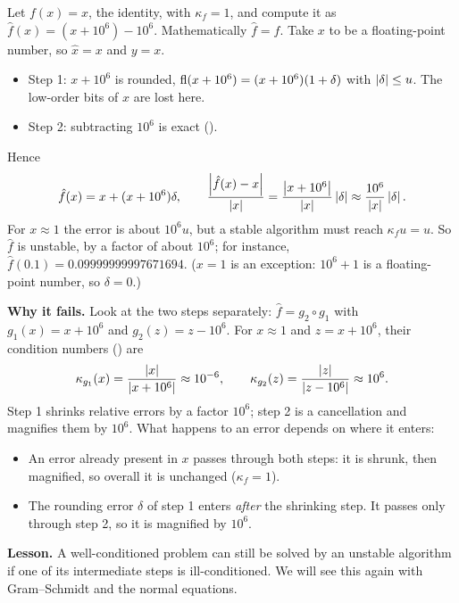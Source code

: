 \begin{example}
  \label{ex:unstable-identity}
  Let $f(x) = x$, the identity, with $\kappa_f = 1$, and compute it as $\hat{f}(x) = (x + 10^6) - 10^6$. Mathematically $\hat{f} = f$. Take $x$ to be a floating-point number, so $\hat{x} = x$ and $y = x$.
  \begin{itemize}
    \item Step 1: $x + 10^6$ is rounded, $\operatorname{fl}(x + 10^6) = (x + 10^6)(1 + \delta)$ with $\left\lvert \delta \right\rvert \le u$. The low-order bits of $x$ are lost here.
    \item Step 2: subtracting $10^6$ is exact ().
  \end{itemize}
  Hence
  \begin{equation}
    \hat{f}(x) = x + (x + 10^6)\delta,
    \qquad
    \frac{\left\lvert \hat{f}(x) - x \right\rvert}{\left\lvert x \right\rvert} = \frac{\left\lvert x + 10^6 \right\rvert}{\left\lvert x \right\rvert}\left\lvert \delta \right\rvert \approx \frac{10^6}{\left\lvert x \right\rvert}\left\lvert \delta \right\rvert.
  \end{equation}
  For $x \approx 1$ the error is about $10^6 u$, but a stable algorithm must reach $\kappa_f u = u$. So $\hat{f}$ is unstable, by a factor of about $10^6$; for instance, $\hat{f}(0.1) = 0.09999999997671694$. ($x = 1$ is an exception: $10^6 + 1$ is a floating-point number, so $\delta = 0$.)

  \textbf{Why it fails.} Look at the two steps separately: $\hat{f} = g_2 \circ g_1$ with $g_1(x) = x + 10^6$ and $g_2(z) = z - 10^6$. For $x \approx 1$ and $z = x + 10^6$, their condition numbers () are
  \begin{equation}
    \kappa_{g_1}(x) = \frac{\left\lvert x \right\rvert}{\left\lvert x + 10^6 \right\rvert} \approx 10^{-6}, \qquad
    \kappa_{g_2}(z) = \frac{\left\lvert z \right\rvert}{\left\lvert z - 10^6 \right\rvert} \approx 10^6.
  \end{equation}
  Step 1 shrinks relative errors by a factor $10^6$; step 2 is a cancellation and magnifies them by $10^6$. What happens to an error depends on where it enters:
  \begin{itemize}
    \item An error already present in $x$ passes through both steps: it is shrunk, then magnified, so overall it is unchanged ($\kappa_f = 1$).
    \item The rounding error $\delta$ of step 1 enters \emph{after} the shrinking step. It passes only through step 2, so it is magnified by $10^6$.
  \end{itemize}
  \textbf{Lesson.} A well-conditioned problem can still be solved by an unstable algorithm if one of its intermediate steps is ill-conditioned. We will see this again with Gram--Schmidt and the normal equations.
\end{example}

